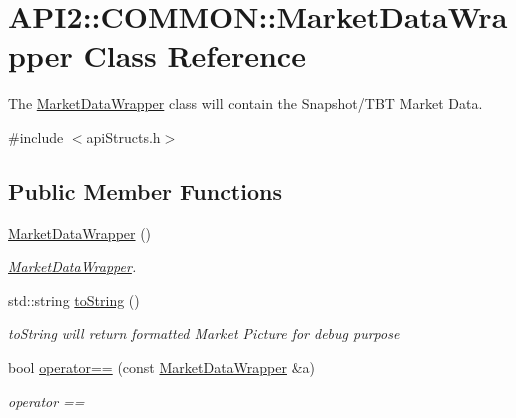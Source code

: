 \hypertarget{class_a_p_i2_1_1_c_o_m_m_o_n_1_1_market_data_wrapper}{\section{A\-P\-I2\-:\-:C\-O\-M\-M\-O\-N\-:\-:Market\-Data\-Wrapper Class Reference}
\label{class_a_p_i2_1_1_c_o_m_m_o_n_1_1_market_data_wrapper}
}


The \hyperlink{class_a_p_i2_1_1_c_o_m_m_o_n_1_1_market_data_wrapper}{Market\-Data\-Wrapper} class will contain the Snapshot/\-T\-B\-T Market Data.  




{\ttfamily \#include $<$api\-Structs.\-h$>$}

\subsection*{Public Member Functions}
\begin{DoxyCompactItemize}
\item 
\hypertarget{class_a_p_i2_1_1_c_o_m_m_o_n_1_1_market_data_wrapper_abd7f1859e66f2d650efd9e45562eb507}{\hyperlink{class_a_p_i2_1_1_c_o_m_m_o_n_1_1_market_data_wrapper_abd7f1859e66f2d650efd9e45562eb507}{Market\-Data\-Wrapper} ()}\label{class_a_p_i2_1_1_c_o_m_m_o_n_1_1_market_data_wrapper_abd7f1859e66f2d650efd9e45562eb507}

\begin{DoxyCompactList}\small\item\em \hyperlink{class_a_p_i2_1_1_c_o_m_m_o_n_1_1_market_data_wrapper}{Market\-Data\-Wrapper}. \end{DoxyCompactList}\item 
std\-::string \hyperlink{class_a_p_i2_1_1_c_o_m_m_o_n_1_1_market_data_wrapper_a301ef6d965a34ec6d4767b8b90879c2c}{to\-String} ()
\begin{DoxyCompactList}\small\item\em to\-String will return formatted Market Picture for debug purpose \end{DoxyCompactList}\item 
bool \hyperlink{class_a_p_i2_1_1_c_o_m_m_o_n_1_1_market_data_wrapper_ae9fbbad2faa3ffce129b08895d616a30}{operator==} (const \hyperlink{class_a_p_i2_1_1_c_o_m_m_o_n_1_1_market_data_wrapper}{Market\-Data\-Wrapper} \&a)
\begin{DoxyCompactList}\small\item\em operator == \end{DoxyCompactList}\end{DoxyCompactItemize}
